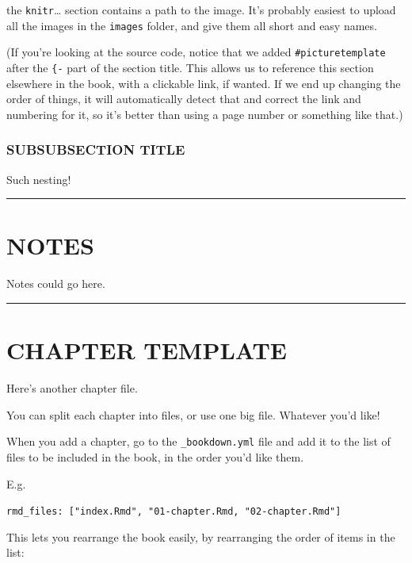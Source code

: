 \documentclass[
]{book}
\begin{document}
the \texttt{knitr}\ldots{} section contains a path to the image.
It's probably easiest to upload all the images in the \texttt{images} folder,
and give them all short and easy names.

(If you're looking at the source code, notice that we added \texttt{\#picturetemplate} after the \texttt{\{-} part of the section title.
This allows us to reference this section elsewhere in the book, with a clickable link, if wanted.
If we end up changing the order of things, it will automatically detect that and correct the link and numbering for it,
so it's better than using a page number or something like that.)

\hypertarget{subsubsection-title}{%
\subsection*{SUBSUBSECTION TITLE}\label{subsubsection-title}}


Such nesting!

\begin{center}\rule{0.5\linewidth}{0.5pt}\end{center}

\hypertarget{notes}{%
\chapter*{NOTES}\label{notes}}


Notes could go here.

\begin{center}\rule{0.5\linewidth}{0.5pt}\end{center}

\hypertarget{chapter-template-1}{%
\chapter*{CHAPTER TEMPLATE}\label{chapter-template-1}}


Here's another chapter file.

You can split each chapter into files, or use one big file. Whatever you'd like!

When you add a chapter, go to the \texttt{\_bookdown.yml} file and add it to the list of files to be included in the book, in the order you'd like them.

E.g.

\texttt{rmd\_files:\ {[}"index.Rmd",\ "01-chapter.Rmd,\ "02-chapter.Rmd"{]}}

This lets you rearrange the book easily, by rearranging the order of items in the list:
\end{document}
